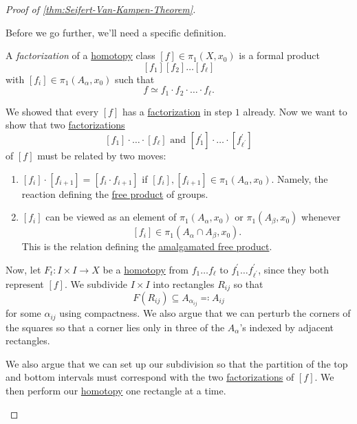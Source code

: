 \begin{proof}[Proof of \autoref{thm:Seifert-Van-Kampen-Theorem}]
\begin{enumerate}
		      Before we go further, we'll need a specific definition.
		      \begin{definition}[Factorization]\label{def:factorization}
			      A \emph{factorization} of a \hyperref[def:homotopy]{homotopy} class \([f]\in \pi _1(X, x_{0})\) is a formal product
			      \[
				      [f_1][f_2]\dots [f_{\ell }]
			      \]
			      with \([f_{i}]\in \pi _1(A_\alpha , x_0)\) such that
			      \[
				      f\simeq f_1\cdot f_2\cdot\dots \cdot f_{\ell}.
			      \]
		      \end{definition}
		      We showed that every \([f]\) has a \hyperref[def:factorization]{factorization} in step \(1\) already. Now we want to show that
		      two \hyperref[def:factorization]{factorizations}
		      \[
			      [f_{1}]\cdot \dots \cdot[f_{\ell }] \text{ and } [f_{1} ^\prime ]\cdot \dots \cdot[f_{\ell ^\prime } ^\prime ]
		      \]
		      of \([f]\) must be related by two moves:
		      \begin{enumerate}[(1)]
			      \item \([f_{i}]\cdot[f_{i+1}] = [f_{i}\cdot f_{i+1}]\) if \([f_{i}], [f_{i+1}]\in \pi _1(A_\alpha , x_0)\). Namely, the reaction
			            defining the \hyperref[def:free-product-with-amalgamation]{free product} of groups.
			      \item \([f_{i}]\) can be viewed as an element of \(\pi _1(A_\alpha , x_{0})\) or \(\pi _1(A_\beta , x_0)\) whenever
			            \[
				            [f_{i}]\in \pi _1(A_\alpha \cap A_\beta , x_{0}).
			            \]
			            This is the relation defining the \hyperref[def:free-product-with-amalgamation]{amalgamated free product}.
		      \end{enumerate}
		      Now, let \(F_{t}\colon I\times I\to X\) be a \hyperref[def:homotopy]{homotopy} from \(f_1 \dots f_{\ell } \) to
		      \(f_1 ^\prime \dots f ^\prime _{\ell ^\prime } \), since they both represent \([f]\). We subdivide \(I\times I\) into
		      rectangles \(R_{ij}\) so that
		      \[
			      F(R_{ij})\subseteq A_{\alpha _{ij}}\eqqcolon A_{ij}
		      \]
		      for some \(\alpha _{ij}\) using compactness. We also argue that we can perturb the corners of the squares so that a corner
		      lies only in three of the \(A_\alpha \)'s indexed by adjacent rectangles.
		      \begin{figure}[H]
			      \centering
			      \label{fig:pf:Seifert-Van-Kampen-thm-1}
		      \end{figure}
		      We also argue that we can set up our subdivision so that the partition of the top and bottom intervals must correspond with the
		      two \hyperref[def:factorization]{factorizations} of \([f]\). We then perform our \hyperref[def:homotopy]{homotopy} one
		      rectangle at a time.
		      \begin{figure}[H]
			      \centering
			      \label{fig:pf:Seifert-Van-Kampen-thm-2}
		      \end{figure}

\end{enumerate}
\end{proof}
